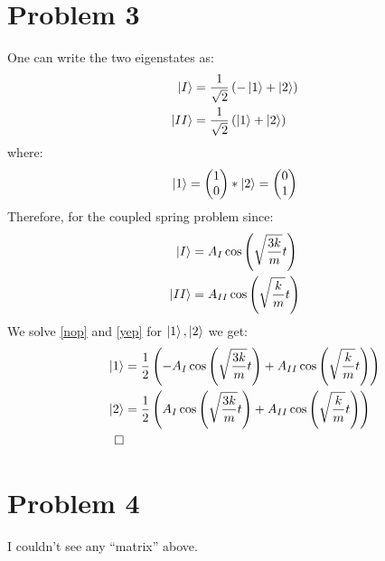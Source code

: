 \documentclass[10pt,twocoloumn]{article}
\begin{document}
\section*{Problem 3}
One can write the two eigenstates as:
\begin{align}
    \left| I \right\rangle &= \frac{1}{\sqrt2} \left(
        -\left| 1 \right\rangle + \left| 2 \right\rangle
    \right)\label{nop}\\
    \left| II \right\rangle &= \frac{1}{\sqrt2}\left(
        \left| 1 \right\rangle + \left| 2 \right\rangle
    \right)\label{yep}
\end{align}
where:
\begin{equation}
    \begin{matrix}
        \left| 1 \right\rangle = \begin{pmatrix} 1 \\ 0 \end{pmatrix} * \left| 2 \right\rangle =\begin{pmatrix} 0 \\ 1 \end{pmatrix}
    \end{matrix}
\end{equation}
Therefore, for the coupled spring problem since:
\begin{align}
    \left| I \right\rangle &= A_I\cos\left(\sqrt{\frac{3k}{m}} t\right)\\
    \left| II \right\rangle &= A_{II}\cos\left(\sqrt{\frac{k}{m}} t\right)
\end{align}
We solve \ref{nop} and \ref{yep} for $\left| 1 \right\rangle, \left| 2 \right\rangle$ we get:
\begin{align}
    \left| 1 \right\rangle &= \frac12\left(
    -A_I\cos\left(\sqrt{\frac{3k}{m}} t\right) + A_{II}\cos\left(\sqrt{\frac{k}{m}} t\right)
    \right)\\
    \left| 2 \right\rangle &= \frac12 \left(
    A_I\cos\left(\sqrt{\frac{3k}{m}} t\right)+
    A_{II}\cos\left(\sqrt{\frac{k}{m}} t\right)
    \right)\\
    \qed
\end{align}

\section*{Problem 4}
I couldn't see any ``matrix'' above.
\end{document}
